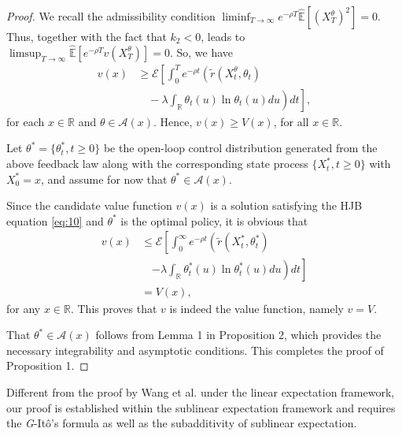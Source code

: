\documentclass[onecolumn, journal]{IEEEtran} %
\begin{document}
\begin{proof}
		We recall the admissibility condition 
		$
		\liminf_{T \to \infty} e^{-\rho T} \mathbb{\hat{E}}\left[ (X_T^\theta)^2 \right] = 0.
		$
		Thus, together with the fact that \( k_2 < 0 \), leads to
		$
		\limsup_{T \to \infty} \mathbb{\hat{E}}\left[ e^{-\rho T} v(X_T^\theta) \right] = 0.
		$
		So, we have
		\[
		\begin{aligned}
			v(x) &\geq \mathcal{E}\left[\int_0^T e^{-\rho t} \left(\tilde{r}(X_t^\theta, \theta_t) 
			\right. \right.  \\
			& \left. \left. \quad- \lambda \int_{\mathbb{R}} \theta_t(u) \ln \theta_t(u)  du \right) dt \right],
		\end{aligned}
		\]
		for each \( x \in \mathbb{R} \) and \( \theta \in \mathcal{A}(x) \). Hence, \( v(x) \geq V(x) \), for all \( x \in \mathbb{R} \).
		
		Let $\theta^* = \{\theta_t^*, t \geq 0\}$ be the open-loop control distribution generated from the above feedback law along with the corresponding state process $\{X_t^*, t \geq 0\}$ with $X_0^* = x$, and
		assume for now that $\theta^* \in \mathcal{A}(x)$. 
		
		Since the candidate value function \( v(x) \) is a solution satisfying the HJB equation \eqref{eq:10} and \(\theta^*\) is the optimal policy, it is obvious that
		\[
		\begin{aligned}
			v(x) &\leq\mathcal{E}\left[\int_0^\infty e^{-\rho t} \left(\tilde{r}(X_t^*, \theta_t^*) \right.\right. \\
			&\quad \left.\left. - \lambda \int_{\mathbb{R}} \theta_t^*(u) \ln \theta_t^*(u) du\right) dt\right]\\
			&=V(x),
		\end{aligned}
		\]
		for any $x \in \mathbb{R}$. This proves that $v$ is indeed the value function, namely $v = V$.  
		
		That $\theta^* \in \mathcal{A}(x)$ follows from Lemma 1 in Proposition 2, which provides the necessary integrability and asymptotic conditions. This completes the proof of Proposition 1.
	\end{proof}
	
	Different from the proof by Wang et al. \cite{wang2020reinforcement} under the linear expectation framework, our proof is established within the sublinear expectation framework and requires the \textit{G}-Itô's formula as well as the subadditivity of sublinear expectation.
	
\end{document}
